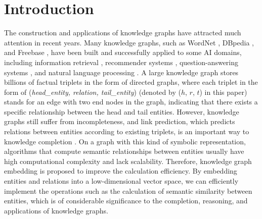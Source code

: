 \documentclass[conference]{IEEEtran}
\begin{document}
\section{Introduction} \label{Introduction}
The construction and applications of knowledge graphs have attracted much attention in recent years. Many knowledge graphs, such as WordNet \cite{WordNet}, DBpedia \cite{DBpedia}, and Freebase \cite{Freebase}, have been built and successfully applied to some AI domains, including information retrieval \cite{Retrieval}, recommender systems \cite{Recommender}, question-answering systems \cite{HaoQA,HuangQA}, and natural language processing \cite{NLP}. A large knowledge graph stores billions of factual triplets in the form of directed graphs, where each triplet in the form of (\textit{head\_entity, relation, tail\_entity}) (denoted by ($h$, $r$, $t$) in this paper) stands for an edge with two end nodes in the graph, indicating that there exists a specific relationship between the head and tail entities. However, knowledge graphs still suffer from incompleteness, and link prediction, which predicts relations between entities according to existing triplets, is an important way to knowledge completion \cite{bootstrapping,Trustworthiness}. On a graph with this kind of symbolic representation, algorithms that compute semantic relationships between entities usually have high computational complexity and lack scalability. Therefore, knowledge graph embedding is proposed to improve the calculation efficiency. By embedding entities and relations into a low-dimensional vector space, we can efficiently implement the operations such as the calculation of semantic similarity between entities, which is of considerable significance to the completion, reasoning, and applications of knowledge graphs.
\end{document}
